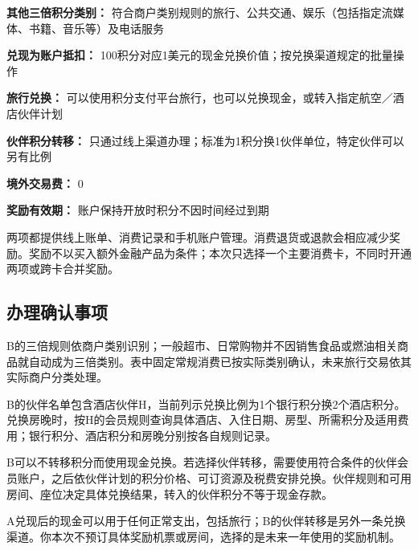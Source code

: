 \documentclass[UTF8,fontset=none,11pt,a4paper]{ctexart}
\begin{document}
\textbf{其他三倍积分类别：} 符合商户类别规则的旅行、公共交通、娱乐（包括指定流媒体、书籍、音乐等）及电话服务


\textbf{兑现为账户抵扣：} 100积分对应1美元的现金兑换价值；按兑换渠道规定的批量操作


\textbf{旅行兑换：} 可以使用积分支付平台旅行，也可以兑换现金，或转入指定航空／酒店伙伴计划


\textbf{伙伴积分转移：} 只通过线上渠道办理；标准为1积分换1伙伴单位，特定伙伴可以另有比例


\textbf{境外交易费：} 0


\textbf{奖励有效期：} 账户保持开放时积分不因时间经过到期


两项都提供线上账单、消费记录和手机账户管理。消费退货或退款会相应减少奖励。奖励不以买入额外金融产品为条件；本次只选择一个主要消费卡，不同时开通两项或跨卡合并奖励。


\subsection*{办理确认事项}
B的三倍规则依商户类别识别；一般超市、日常购物并不因销售食品或燃油相关商品就自动成为三倍类别。表中固定常规消费已按实际类别确认，未来旅行交易依其实际商户分类处理。


B的伙伴名单包含酒店伙伴H，当前列示兑换比例为1个银行积分换2个酒店积分。兑换房晚时，按H的会员规则查询具体酒店、入住日期、房型、所需积分及适用费用；银行积分、酒店积分和房晚分别按各自规则记录。


B可以不转移积分而使用现金兑换。若选择伙伴转移，需要使用符合条件的伙伴会员账户，之后依伙伴计划的积分价格、可订资源及税费安排兑换。伙伴规则和可用房间、座位决定具体兑换结果，转入的伙伴积分不等于现金存款。


A兑现后的现金可以用于任何正常支出，包括旅行；B的伙伴转移是另外一条兑换渠道。你本次不预订具体奖励机票或房间，选择的是未来一年使用的奖励机制。
\end{document}
